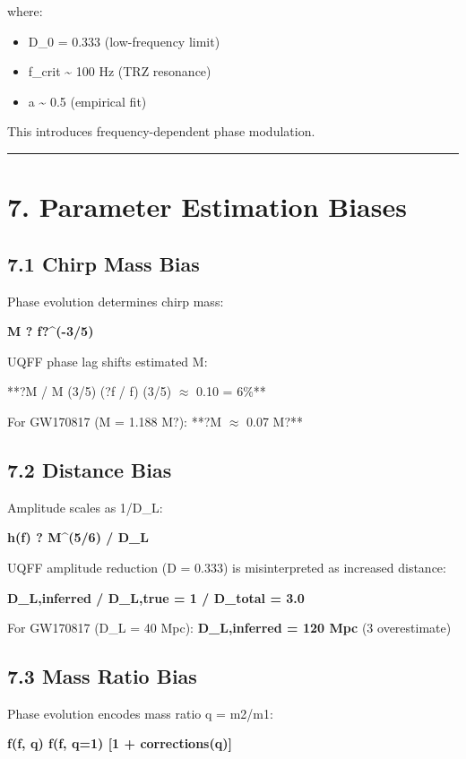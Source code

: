 \documentclass[11pt]{article}
\begin{document}
where:

\begin{itemize}
  \item D\_0 = 0.333 (low-frequency limit)
  \item f\_crit \textasciitilde{} 100 Hz (TRZ resonance)
  \item a \textasciitilde{} 0.5 (empirical fit)
\end{itemize}

This introduces frequency-dependent phase modulation.

\noindent\rule{\textwidth}{0.4pt}

\section*{7. Parameter Estimation Biases}

\subsection*{7.1 Chirp Mass Bias}

Phase evolution determines chirp mass:

\textbf{M ? f?\textasciicircum{}(-3/5)}

UQFF phase lag shifts estimated M:

**?M / M  (3/5)  (?f / f)  (3/5) $\approx$ 0.10 = 6\%**

For GW170817 (M = 1.188 M?): **?M $\approx$ 0.07 M?**

\subsection*{7.2 Distance Bias}

Amplitude scales as 1/D\_L:

\textbf{h(f) ? M\textasciicircum{}(5/6) / D\_L}

UQFF amplitude reduction (D = 0.333) is misinterpreted as increased distance:

\textbf{D\_L,inferred / D\_L,true = 1 / D\_total = 3.0}

For GW170817 (D\_L = 40 Mpc): \textbf{D\_L,inferred = 120 Mpc} (3 overestimate)

\subsection*{7.3 Mass Ratio Bias}

Phase evolution encodes mass ratio q = m2/m1:

\textbf{f(f, q)  f(f, q=1)  [1 + corrections(q)]}
\end{document}
